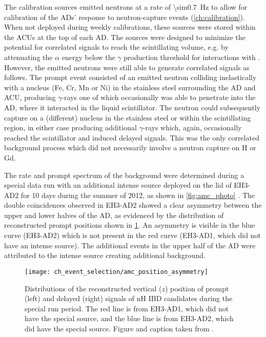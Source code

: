 The \amc{} calibration sources emitted neutrons at a rate of \SI{\sim0.7}{\Hz}
to allow for calibration of the ADs' response to neutron-capture events
(\cref{ch:calibration}).
When not deployed during weekly calibrations, these sources
were stored within the ACUs at the top of each AD.
The sources were designed to minimize
the potential for correlated signals to reach the scintillating volume,
e.g. by attenuating the $\alpha$ energy below the $\gamma$ production
threshold for interactions with  \cite{ngd2016}.
However, the emitted neutrons were still able to generate
correlated signals as follows.
The prompt event consisted of an emitted neutron colliding inelastically
with a nucleus (Fe, Cr, Mn or Ni) in the stainless steel surrounding the AD and ACU,
producing $\gamma$-rays one of which occasionally was able to penetrate
into the AD, where it interacted in the liquid scintillator.
The neutron could subsequently capture on a (different) nucleus
in the stainless steel or within the scintillating region,
in either case producing additional $\gamma$-rays
which, again, occasionally reached the scintillator and induced delayed signals.
This was the only correlated background process
which did not necessarily involve a neutron capture on H or Gd.

The rate and prompt spectrum of the \amc{} background were determined
during a special data run with an additional intense \amc{} source
deployed on the lid of EH3-AD2 for 10 days during the summer of 2012,
as shown in \cref{fig:amc_photo} \cite{nh2016technote}.
The double coincidences observed in EH3-AD2 showed a clear asymmetry
between the upper and lower halves of the AD,
as evidenced by the distribution of reconstructed prompt positions
shown in \cref{fig:amc_position}.
An asymmetry is visible in the blue curve (EH3-AD2)
which is not present in the red curve
(EH3-AD1, which did not have an intense \amc{} source).
The additional events in the upper half of the AD
were attributed to the intense \amc{} source creating additional background.

\begin{figure}
    \centering
    \texttt{[image: ch\_event\_selection/amc\_position\_asymmetry]}
    \caption[Intense \amc{} run vertical positions]{
        Distributions of the reconstructed vertical ($z$) position
        of prompt (left) and delayed (right) signals of nH IBD candidates
        during the special \amc{} run period.
        The red line is from EH3-AD1, which did not have the special \amc{} source,
        and the blue line is from EH3-AD2, which did have the special \amc{} source.
        Figure and caption taken from \cite{nh2016technote}.
    }
    \label{fig:amc_position}
\end{figure}

